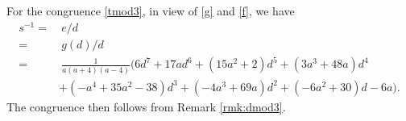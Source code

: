 \documentclass{gtpart}
\theoremstyle{definition}
\theoremstyle{remark}
\begin{document}
For the congruence \eqref{tmod3}, in view of \eqref{g} and \eqref{f}, we have 
\begin{equation*}
\begin{split}
 s^{-1} = & ~ e / d \\
        = & ~ g(d) / d \\
        = & ~ \frac{1}{a (a + 4) (a - 4)} \big( 6 d^7 + 17 a d^6 + (15 a^2 + 2) d^5 + (3 a^3 + 48 a) d^4 \\
          & + (-a^4 + 35 a^2 - 38) d^3 + (-4 a^3 + 69 a) d^2 + (-6 a^2 + 30) d - 6 a \big).  
\end{split}
\end{equation*}
The congruence then follows from Remark \ref{rmk:dmod3}.  


%
%

\renewcommand\refname{Bibliography}
\end{document}
